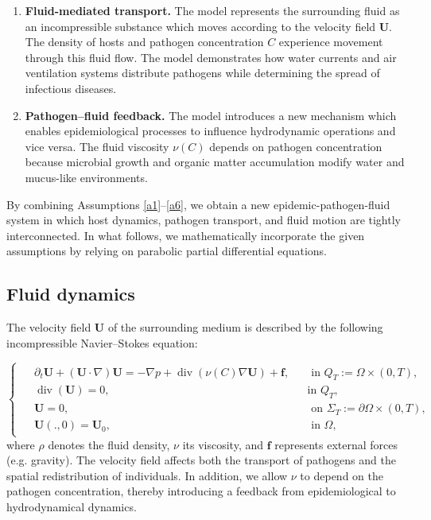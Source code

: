 \documentclass[10pt,number,preprint,times]{elsarticle}
\numberwithin{equation}{section} %
\begin{document}
\begin{enumerate}[label=\textcolor{blue}{({A${{_\arabic*}}$})}]
	\item \textbf{Fluid-mediated transport.}  
	The model represents the surrounding fluid as an incompressible substance which moves according to the velocity field $\boldsymbol{U}$. The  density of hosts and pathogen concentration $C$ experience movement through this fluid flow. The model demonstrates how water currents and air ventilation systems distribute pathogens while determining the spread of infectious diseases.
	
	\item \label{a6} \textbf{Pathogen–fluid feedback.}  
	The model introduces a new mechanism which enables epidemiological processes to influence hydrodynamic operations and vice versa. The fluid viscosity $\nu(C)$ depends on pathogen concentration because microbial growth and organic matter accumulation modify water and mucus-like environments. 
\end{enumerate}



By combining Assumptions \ref{a1}–\ref{a6}, we obtain a new epidemic-pathogen-fluid system in which host dynamics, pathogen transport, and fluid motion are tightly interconnected. In what follows, we mathematically incorporate the given assumptions by relying on parabolic partial differential equations.

	
	
	
	\subsection{{Fluid dynamics}}
	
	\noindent
	The velocity field $\boldsymbol{U}$ of the surrounding medium is described by the following incompressible Navier–Stokes equation:
	
	
	\begin{equation}
		\begin{cases}
			\begin{split}
				&\partial_t \boldsymbol{U} +(\boldsymbol{U}\cdot\nabla)\boldsymbol{U} = -\nabla p + \operatorname{div}(\nu(C)\nabla\boldsymbol{U} )+ \boldsymbol{f}, &&\text{ in } Q_T:=\Omega \times (0,T), \\
				&\operatorname{div}(\boldsymbol{U})=0, &&\text{in } Q_T,\\
				&\boldsymbol{U}=0, && \text{ on } \Sigma_T:=\partial \Omega \times (0,T),\\
				&\boldsymbol{U}(.,0)=\boldsymbol{U}_0,  && \text{ in } \Omega,
			\end{split}
		\end{cases}
	\end{equation}
	where $\rho$ denotes the fluid density, $\nu$ its viscosity, and $\boldsymbol{f}$ represents external forces (e.g. gravity). The velocity field affects both the transport of pathogens and the spatial redistribution of individuals. In addition, we allow $\nu$ to depend on the pathogen concentration, thereby introducing a feedback from epidemiological to hydrodynamical dynamics.
	
\end{document}
